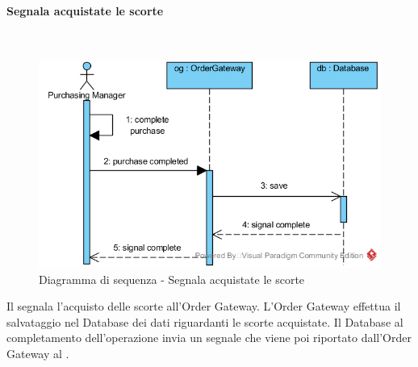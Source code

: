 \begin{samepage}
\paragraph{Segnala acquistate le scorte}\mbox{}\\
\end{samepage}
\begin{figure}[H]
	\centering
	\includegraphics[width=15cm]{../../documenti/SpecificaTecnica/diagrammi/sequenza/responsabile_acquisti_segnala_scorte_acquistate.png}
	\caption{Diagramma di sequenza - Segnala acquistate le scorte}
\end{figure}
Il \Purchasingmanager{} segnala l'acquisto delle scorte all'Order Gateway. L'Order Gateway effettua il salvataggio nel Database dei dati riguardanti le scorte acquistate. Il Database al completamento dell'operazione invia un segnale che viene poi riportato dall'Order Gateway al \Purchasingmanager{}.

\subsubsection{\Manager{}}

